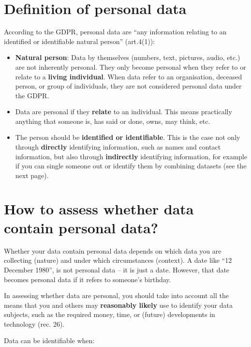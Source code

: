 \documentclass[
]{book}
\providecommand{\tightlist}{%
  \setlength{\itemsep}{0pt}\setlength{\parskip}{0pt}}
\begin{document}
\hypertarget{definition-personal-data}{%
\section{Definition of personal data}\label{definition-personal-data}}

According to the GDPR, personal data are ``any information relating to an
identified or identifiable natural person''
(art.4(1)):

\begin{itemize}
\tightlist
\item
  \textbf{Natural person}: Data by themselves (numbers, text, pictures, audio, etc.)
  are not inherently personal. They only become personal when they refer to or
  relate to a \textbf{living individual}. When data refer to an organisation,
  deceased person, or group of individuals, they are not considered personal data
  under the GDPR.
\item
  Data are personal if they \textbf{relate} to an individual. This means practically
  anything that someone is, has said or done, owns, may think, etc.
\item
  The person should be \textbf{identified or identifiable}. This is the case not
  only through \textbf{directly} identifying information, such as names and contact
  information, but also through \textbf{indirectly} identifying information, for
  example if you can single someone out or identify them by combining datasets
  (see the next page).
\end{itemize}

\hypertarget{personal-data-assess}{%
\section{How to assess whether data contain personal data?}\label{personal-data-assess}}

Whether your data contain personal data depends on which data you are
collecting (nature) and under which circumstances (context). A date like
``12 December 1980'', is not personal data -- it is just a date. However, that
date becomes personal data if it refers to someone's birthday.

In assessing whether data are personal, you should take into account all the
means that you and others may \textbf{reasonably likely} use to identify your data
subjects, such as the required money, time, or (future) developments in
technology (rec. 26).

Data can be identifiable when:
\end{document}
